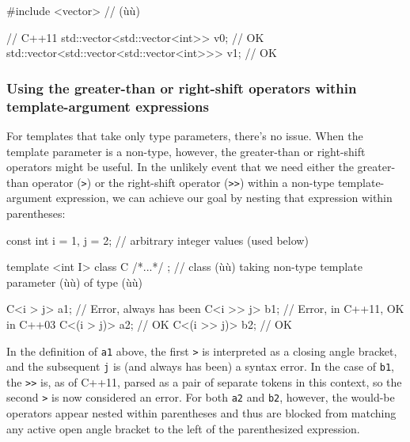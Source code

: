 \begin{emcppshiddenlisting}[emcppsbatch=e2]
#include <vector>  // (ù{}ù)
\end{emcppshiddenlisting}
\begin{emcppslisting}[emcppsbatch=e2]
// C++11
std::vector<std::vector<int>> v0;               // OK
std::vector<std::vector<std::vector<int>>> v1;  // OK
\end{emcppslisting}

\subsubsection[Using the greater-than or right-shift operators within template-argument expressions]{Using the greater-than or right-shift operators within\\[0.5ex] template-argument expressions}\label{using-the-greater-than-or-right-shift-operators-within-template-argument-expressions}

For templates that take only type parameters, there's no issue. When the
template parameter is a non-type, however, the greater-than or right-shift operators might be
useful. In the unlikely event that we need either the greater-than
operator (\lstinline!>!) or the right-shift operator (\lstinline!>>!) within a
non-type template-argument expression, we can achieve our goal by
nesting that expression within parentheses:

\begin{emcppslisting}
const int i = 1, j = 2;  // arbitrary integer values (used below)

template <int I> class C { /*...*/ };
    // class (ù{}ù) taking non-type template parameter (ù{}ù) of type (ù{}ù)

C<i > j>    a1;  // Error, always has been
C<i >> j>   b1;  // Error, in C++11, OK in C++03
C<(i > j)>  a2;  // OK
C<(i >> j)> b2;  // OK
\end{emcppslisting}


\noindent In the definition of \lstinline!a1! above, the first \lstinline!>! is
interpreted as a closing angle bracket, and the subsequent \lstinline!j! is
(and always has been) a syntax error. In the case of \lstinline!b1!, the
\lstinline!>>! is, as of C++11, parsed as a pair of separate tokens in this
context, so the second \lstinline!>! is now considered an error. For
both \lstinline!a2! and \lstinline!b2!, however, the would-be operators appear
nested within parentheses and thus are blocked from matching any
active open angle bracket to the left of the parenthesized expression.

